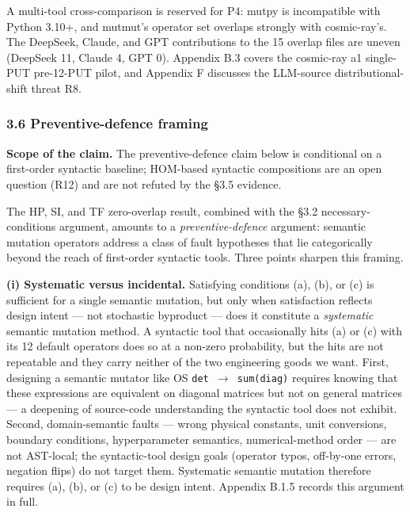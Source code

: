 \documentclass[review,12pt,authoryear]{elsarticle}
\begin{document}
A multi-tool cross-comparison is reserved for P4: mutpy is incompatible
with Python 3.10+, and mutmut's operator set overlaps strongly with
cosmic-ray's. The DeepSeek, Claude, and GPT contributions to the 15
overlap files are uneven (DeepSeek 11, Claude 4, GPT 0). Appendix B.3
covers the cosmic-ray a1 single-PUT pre-12-PUT pilot, and Appendix F
discusses the LLM-source distributional-shift threat R8.

\subsubsection{3.6 Preventive-defence
framing}\label{preventive-defence-framing}

\textbf{Scope of the claim.} The preventive-defence claim below is
conditional on a first-order syntactic baseline; HOM-based syntactic
compositions are an open question (R12) and are not refuted by the §3.5
evidence.

The HP, SI, and TF zero-overlap result, combined with the §3.2
necessary-conditions argument, amounts to a \emph{preventive-defence}
argument: semantic mutation operators address a class of fault
hypotheses that lie categorically beyond the reach of first-order
syntactic tools. Three points sharpen this framing.

\textbf{(i) Systematic versus incidental.} Satisfying conditions (a),
(b), or (c) is sufficient for a single semantic mutation, but only when
satisfaction reflects design intent --- not stochastic byproduct ---
does it constitute a \emph{systematic} semantic mutation method. A
syntactic tool that occasionally hits (a) or (c) with its 12 default
operators does so at a non-zero probability, but the hits are not
repeatable and they carry neither of the two engineering goods we want.
First, designing a semantic mutator like OS \texttt{det\ $\to$\ sum(diag)}
requires knowing that these expressions are equivalent on diagonal
matrices but not on general matrices --- a deepening of source-code
understanding the syntactic tool does not exhibit. Second,
domain-semantic faults --- wrong physical constants, unit conversions,
boundary conditions, hyperparameter semantics, numerical-method order
--- are not AST-local; the syntactic-tool design goals (operator typos,
off-by-one errors, negation flips) do not target them. Systematic
semantic mutation therefore requires (a), (b), or (c) to be design
intent. Appendix B.1.5 records this argument in full.
\end{document}
